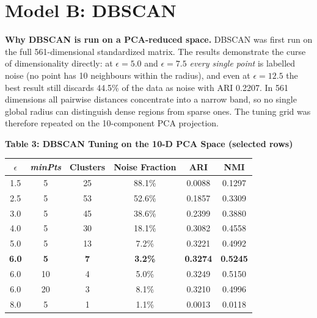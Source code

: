 \documentclass[12pt,a4paper]{article}
\newenvironment{fitwidth}
  {\begin{lrbox}{\fitbox}}
  {\end{lrbox}\ifdim\wd\fitbox>\linewidth\resizebox{\linewidth}{!}{\usebox{\fitbox}}\else\usebox{\fitbox}\fi}
\DeclareRobustCommand{\_}{\textunderscore\allowbreak}
\begin{document}
\section{Model B: DBSCAN}
\label{sec:dbscan}

\textbf{Why DBSCAN is run on a PCA-reduced space.} DBSCAN was first run on the
full 561-dimensional standardized matrix. The results demonstrate the curse of
dimensionality directly: at $\epsilon = 5.0$ and $\epsilon = 7.5$ \emph{every
single point} is labelled noise (no point has 10 neighbours within the
radius), and even at $\epsilon = 12.5$ the best result still discards 44.5\%
of the data as noise with ARI 0.2207. In 561 dimensions all pairwise distances
concentrate into a narrow band, so no single global radius can distinguish
dense regions from sparse ones. The tuning grid was therefore repeated on the
10-component PCA projection.

\begin{center}
\begin{minipage}{\linewidth}\centering
\textbf{Table 3: DBSCAN Tuning on the 10-D PCA Space (selected rows)}\par\smallskip
\begin{fitwidth}
\begin{tabular}{cccccc}
\toprule
$\epsilon$ & \textit{minPts} & Clusters & Noise Fraction & ARI & NMI \\
\midrule
1.5 & 5 & 25 & 88.1\% & 0.0088 & 0.1297 \\
2.5 & 5 & 53 & 52.6\% & 0.1857 & 0.3309 \\
3.0 & 5 & 45 & 38.6\% & 0.2399 & 0.3880 \\
4.0 & 5 & 30 & 18.1\% & 0.3082 & 0.4558 \\
5.0 & 5 & 13 & 7.2\% & 0.3221 & 0.4992 \\
\textbf{6.0} & \textbf{5} & \textbf{7} & \textbf{3.2\%} & \textbf{0.3274} & \textbf{0.5245} \\
6.0 & 10 & 4 & 5.0\% & 0.3249 & 0.5150 \\
6.0 & 20 & 3 & 8.1\% & 0.3210 & 0.4996 \\
8.0 & 5 & 1 & 1.1\% & 0.0013 & 0.0118 \\
\bottomrule
\end{tabular}
\end{fitwidth}
\end{minipage}
\end{center}
\end{document}
